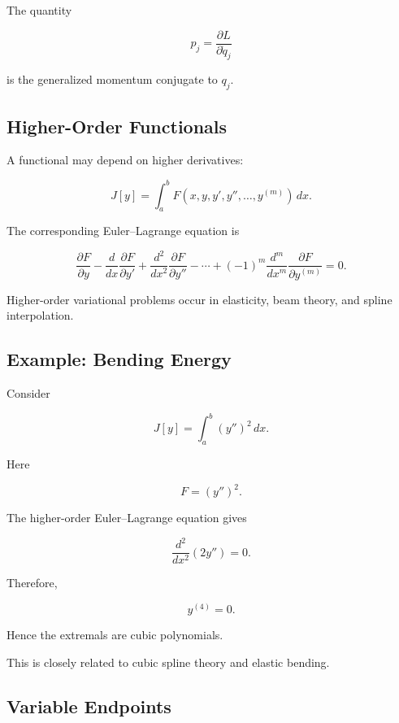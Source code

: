 The quantity

\[
\boxed{
p_j
=
\frac{\partial L}{\partial\dot q_j}
}
\]

is the generalized momentum conjugate to \(q_j\).

\subsection{Higher-Order Functionals}
\label{subsec:higher-order-functionals}

A functional may depend on higher derivatives:

\[
\boxed{
J[y]
=
\int_a^b
F(x,y,y',y'',\ldots,y^{(m)})\,dx.
}
\]

The corresponding Euler--Lagrange equation is

\[
\boxed{
\frac{\partial F}{\partial y}
-
\frac{d}{dx}
\frac{\partial F}{\partial y'}
+
\frac{d^2}{dx^2}
\frac{\partial F}{\partial y''}
-\cdots+
(-1)^m
\frac{d^m}{dx^m}
\frac{\partial F}{\partial y^{(m)}}
=
0.
}
\]

Higher-order variational problems occur in elasticity, beam theory, and
spline interpolation.

\subsection{Example: Bending Energy}
\label{subsec:bending-energy}

Consider

\[
\boxed{
J[y]
=
\int_a^b
(y'')^2\,dx.
}
\]

Here

\[
F=(y'')^2.
\]

The higher-order Euler--Lagrange equation gives

\[
\frac{d^2}{dx^2}
\left(
2y''
\right)
=
0.
\]

Therefore,

\[
\boxed{
y^{(4)}=0.
}
\]

Hence the extremals are cubic polynomials.

This is closely related to cubic spline theory and elastic bending.

\subsection{Variable Endpoints}
\label{subsec:variable-endpoints}


